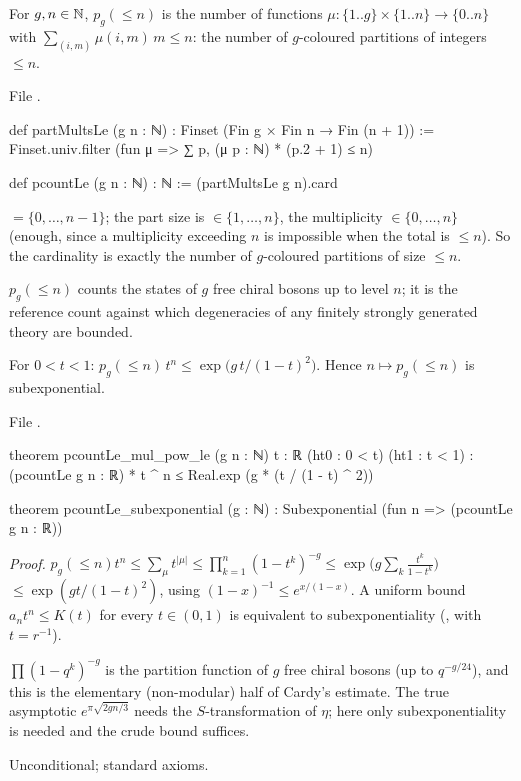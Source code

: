 \begin{definition}\label{l14:def:pcount}
For $g,n\in{\mathbb{N}}$, $p_g(\le n)$ is the number of functions $\mu:\{1..g\}\times\{1..n\}\to\{0..n\}$ with
$\sum_{(i,m)}\mu(i,m)\,m\le n$: the number of $g$-coloured partitions of integers $\le n$.
\end{definition}
\noindent File .
\begin{leancode}
def partMultsLe (g n : ℕ) : Finset (Fin g × Fin n → Fin (n + 1)) :=
  Finset.univ.filter (fun μ => ∑ p, (μ p : ℕ) * (p.2 + 1) ≤ n)

def pcountLe (g n : ℕ) : ℕ := (partMultsLe g n).card
\end{leancode}
\begin{dictionary}
 $=\{0,\dots,n-1\}$; the part size is  $\in\{1,\dots,n\}$, the multiplicity 
$\in\{0,\dots,n\}$ (enough, since a multiplicity exceeding $n$ is impossible when the total is $\le n$). So the cardinality is
exactly the number of $g$-coloured partitions of size $\le n$.
\end{dictionary}
\begin{physics}
$p_g(\le n)$ counts the states of $g$ free chiral bosons up to level $n$; it is the reference count against which degeneracies of any finitely strongly generated theory are bounded.
\end{physics}

\begin{theorem}\label{l14:thm:pcount}
For $0<t<1$: $p_g(\le n)\,t^n\le\exp\!\bigl(g\,t/(1-t)^2\bigr)$. Hence $n\mapsto p_g(\le n)$ is subexponential.
\end{theorem}
\noindent File .
\begin{leancode}
theorem pcountLe_mul_pow_le (g n : ℕ) {t : ℝ} (ht0 : 0 < t) (ht1 : t < 1) :
    (pcountLe g n : ℝ) * t ^ n ≤ Real.exp (g * (t / (1 - t) ^ 2))

theorem pcountLe_subexponential (g : ℕ) : Subexponential (fun n => (pcountLe g n : ℝ))
\end{leancode}
\noindent\emph{Proof.} $p_g(\le n)t^n\le\sum_\mu t^{|\mu|}\le\prod_{k=1}^n(1-t^k)^{-g}\le\exp\bigl(g\sum_k\frac{t^k}{1-t^k}\bigr)$
$\le\exp(gt/(1-t)^2)$, using $(1-x)^{-1}\le e^{x/(1-x)}$. A uniform bound $a_nt^n\le K(t)$ for every $t\in(0,1)$ is equivalent
to subexponentiality (, with $t = r^{-1}$).
\begin{physics}
$\prod(1-q^k)^{-g}$ is the partition function of $g$ free chiral bosons (up to $q^{-g/24}$), and this is the elementary
(non-modular) half of Cardy's estimate. The true asymptotic $e^{\pi\sqrt{2gn/3}}$ needs the $S$-transformation of $\eta$;
here only subexponentiality is needed and the crude bound suffices.
\end{physics}
\begin{status}
Unconditional; standard axioms.
\end{status}

